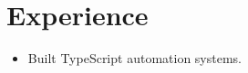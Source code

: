 \documentclass{article}
\begin{document}
\section{Experience}
\begin{itemize}
\item Built TypeScript automation systems.
\end{itemize}
\end{document}
